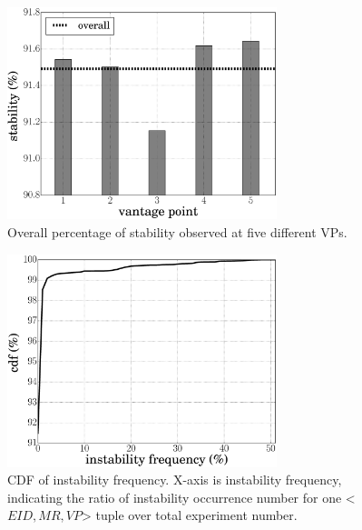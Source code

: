 \begin{figure}[t]
    \centering
	\includegraphics[width=0.7\textwidth]{Pics/Percentage_stability_5VP_time.eps}
	\caption{Overall percentage of stability observed at five different VPs.}
	\label{fig:Percentage_stability_5VP_time}
\end{figure}

\begin{figure}[t]
	\centering
	\includegraphics[width=0.7\textwidth]{Pics/cdf_instability_occur.eps}
	\caption{CDF of instability frequency. X-axis is instability frequency, indicating the ratio of instability occurrence number for one <$EID, MR, VP$> tuple over total experiment number.}
	\label{fig:cdf_instability_occur}
\end{figure}


